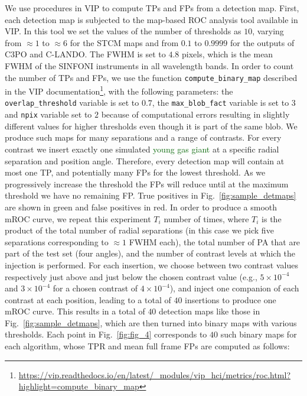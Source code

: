 \documentclass[referee]{aa} %
\newcommand{\newchange}[1]{\textcolor{darkgreen}{#1}}
\begin{document}
We use procedures in VIP \citep{2017AJGomezVIP,2023Christiaens} to compute TPs and FPs from a detection map. First, each detection map is subjected to the map-based ROC analysis tool available in VIP. In this tool we set the values of the number of thresholds as $10$, varying from $\approx 1$ to $\approx 6$ for the STCM maps and from $0.1$ to $0.9999$ for the outputs of C3PO and C-LANDO. The FWHM is set to $4.8$ pixels, which is the mean FWHM of the SINFONI instruments in all wavelength bands. 
In order to count the number of TPs and FPs, we use the function \texttt{compute\_binary\_map} described in the VIP documentation\footnote{\url{https://vip.readthedocs.io/en/latest/_modules/vip_hci/metrics/roc.html?highlight=compute_binary_map}}, with the following parameters: the \texttt{overlap\_threshold} variable is set to $0.7$, the \texttt{max\_blob\_fact} variable is set to $3$ and \texttt{npix} variable set to $2$ because of computational errors resulting in slightly different values for higher thresholds even though it is part of the same blob.
We produce such maps for many separations and a range of contrasts.
For every contrast we insert exactly one simulated \newchange{young gas giant} at a specific radial separation and position angle.
Therefore, every detection map will contain at most one TP, and potentially many FPs for the lowest threshold. 
As we progressively increase the threshold the FPs will reduce until at the maximum threshold we have no remaining FP. 
True positives in Fig.~\ref{fig:sample_detmaps} are shown in green and false positives in red.
In order to produce a smooth mROC curve, we repeat this experiment $T_{i}$ number of times, where $T_{i}$ is the product of the total number of radial separations (in this case we pick five separations corresponding to $\approx 1$ FWHM each), the total number of PA that are part of the test set (four angles), and the number of contrast levels at which the injection is performed.
For each insertion, we choose between two contrast values respectively just above and just below the chosen contrast value (e.g., $5\times10^{-4}$ and $3\times10^{-4}$ for a chosen contrast of $4\times10^{-4}$), and inject one companion of each contrast at each position, leading to a total of $40$ insertions to produce one mROC curve.
This results in a total of $40$ detection maps like those in Fig.~\ref{fig:sample_detmaps}, which are then turned into binary maps with various thresholds. 
Each point in Fig.~\ref{fig:fig_4} corresponds to $40$ such binary maps for each algorithm, whose TPR and mean full frame FPs are computed as follows:
\end{document}

